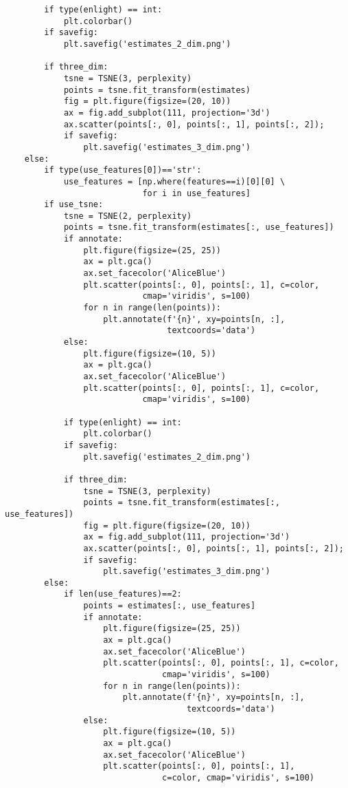 \documentclass[a4paper, 12pt]{extreport}
\begin{document}
\begin{verbatim}
        if type(enlight) == int:
            plt.colorbar()
        if savefig:
            plt.savefig('estimates_2_dim.png')

        if three_dim:
            tsne = TSNE(3, perplexity)
            points = tsne.fit_transform(estimates)
            fig = plt.figure(figsize=(20, 10))
            ax = fig.add_subplot(111, projection='3d')
            ax.scatter(points[:, 0], points[:, 1], points[:, 2]);
            if savefig:
                plt.savefig('estimates_3_dim.png')
    else:
        if type(use_features[0])=='str':
            use_features = [np.where(features==i)[0][0] \
                            for i in use_features]
        if use_tsne:
            tsne = TSNE(2, perplexity)
            points = tsne.fit_transform(estimates[:, use_features])
            if annotate:
                plt.figure(figsize=(25, 25))
                ax = plt.gca()
                ax.set_facecolor('AliceBlue')
                plt.scatter(points[:, 0], points[:, 1], c=color,
                            cmap='viridis', s=100)
                for n in range(len(points)):
                    plt.annotate(f'{n}', xy=points[n, :],
                                 textcoords='data')
            else:
                plt.figure(figsize=(10, 5))
                ax = plt.gca()
                ax.set_facecolor('AliceBlue')
                plt.scatter(points[:, 0], points[:, 1], c=color,
                            cmap='viridis', s=100)

            if type(enlight) == int:
                plt.colorbar()
            if savefig:
                plt.savefig('estimates_2_dim.png')

            if three_dim:
                tsne = TSNE(3, perplexity)
                points = tsne.fit_transform(estimates[:, use_features])
                fig = plt.figure(figsize=(20, 10))
                ax = fig.add_subplot(111, projection='3d')
                ax.scatter(points[:, 0], points[:, 1], points[:, 2]);
                if savefig:
                    plt.savefig('estimates_3_dim.png')
        else:
            if len(use_features)==2:
                points = estimates[:, use_features]
                if annotate:
                    plt.figure(figsize=(25, 25))
                    ax = plt.gca()
                    ax.set_facecolor('AliceBlue')
                    plt.scatter(points[:, 0], points[:, 1], c=color,
                                cmap='viridis', s=100)
                    for n in range(len(points)):
                        plt.annotate(f'{n}', xy=points[n, :],
                                     textcoords='data')
                else:
                    plt.figure(figsize=(10, 5))
                    ax = plt.gca()
                    ax.set_facecolor('AliceBlue')
                    plt.scatter(points[:, 0], points[:, 1],
                                c=color, cmap='viridis', s=100)


\end{verbatim}
\end{document}
